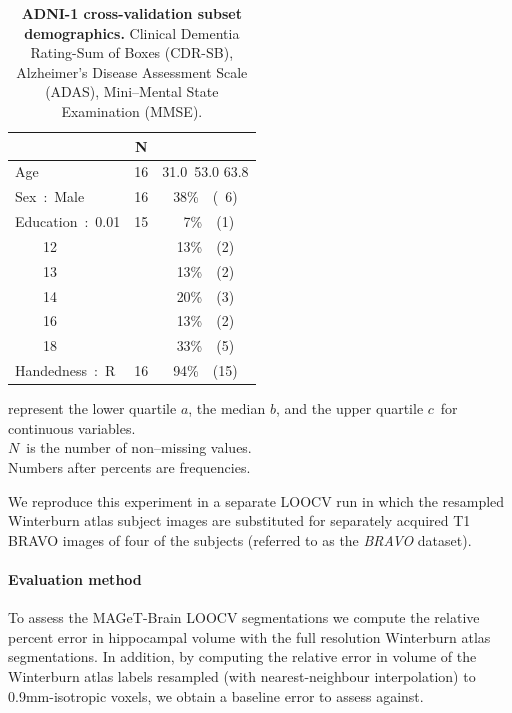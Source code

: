 \documentclass{article}\usepackage{graphicx, color}
\newcommand{\mb}{MAGeT-Brain }
\begin{document}
%                                     
%
\begin{table}[!tbp]
\scriptsize
\caption{\textbf{ADNI-1 cross-validation subset demographics.} Clinical Dementia Rating-Sum of Boxes (CDR-SB), Alzheimer's Disease Assessment Scale (ADAS), Mini–Mental State Examination (MMSE).\label{tab:WAval-healthy-demographics}} 
\begin{center}
\begin{tabular}{lrc}
\hline\hline
\multicolumn{1}{l}{}&\multicolumn{1}{c}{N}&\multicolumn{1}{c}{ }\tabularnewline
\hline
Age&16&{\scriptsize 31.0~}{53.0 }{\scriptsize 63.8} \tabularnewline
Sex~:~Male&16&38\%~{\scriptsize~(~6)}\tabularnewline
Education~:~0.01&15&~7\%~{\scriptsize~(1)}\tabularnewline
~~~~12&&13\%~{\scriptsize~(2)}\tabularnewline
~~~~13&&13\%~{\scriptsize~(2)}\tabularnewline
~~~~14&&20\%~{\scriptsize~(3)}\tabularnewline
~~~~16&&13\%~{\scriptsize~(2)}\tabularnewline
~~~~18&&33\%~{\scriptsize~(5)}\tabularnewline
Handedness~:~R&16&94\%~{\scriptsize~(15)}\tabularnewline
\hline
\end{tabular}
\end{center}
 represent the lower quartile $a$, the median $b$, and the upper quartile $c$\ for continuous variables.\\$N$\ is the number of non--missing values.\\Numbers after percents are frequencies.\end{table}




We reproduce this experiment in a separate LOOCV run in which the resampled 
Winterburn atlas subject images are substituted for separately acquired T1 
BRAVO images of four of the subjects (referred to as the {\em BRAVO} dataset).

\paragraph{Evaluation method}  
To assess the \mb LOOCV segmentations we compute the relative percent error in 
hippocampal volume with the full resolution Winterburn atlas 
segmentations. In addition, by computing the relative error in volume of the
Winterburn atlas labels resampled (with nearest-neighbour interpolation) to
0.9mm-isotropic voxels, we obtain a baseline error to assess against.
\end{document}
